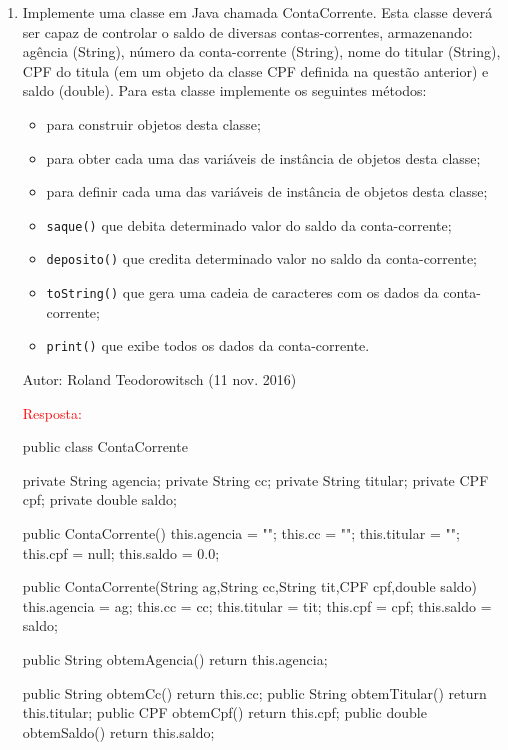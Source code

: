 \documentclass[onecolumn,a4paper,10pt]{report}
\newcommand{\+}{\, + \,}
\newcommand{\<}{\hspace*{-0.4cm}}
\begin{document}
\begin{enumerate}
\item Implemente uma classe em Java chamada ContaCorrente. Esta classe deverá ser capaz de controlar o saldo de diversas contas-correntes, armazenando: agência (String), número da conta-corrente (String), nome do titular (String), CPF do titula (em um objeto da classe CPF definida na questão anterior) e saldo (double). Para esta classe implemente os seguintes métodos:
\begin{itemize}
\item para construir objetos desta classe;
\item para obter cada uma das variáveis de instância de objetos desta classe;
\item para definir cada uma das variáveis de instância de objetos desta classe;
\item \texttt{saque()} que debita determinado valor do saldo da conta-corrente;
\item \texttt{deposito()} que credita determinado valor no saldo da conta-corrente;
\item \texttt{toString()} que gera uma cadeia de caracteres com os dados da conta-corrente;
\item \texttt{print()} que exibe todos os dados da conta-corrente.
\end{itemize}
{\tiny Autor: Roland Teodorowitsch (11 nov. 2016)}\\
\newpage
{\tiny \textcolor{red}{Resposta:}\\
\begin{javacode}
public class ContaCorrente {
    private String agencia;
    private String cc;
    private String titular;
    private CPF cpf;
    private double saldo;
    
    public ContaCorrente() {
        this.agencia = "";
        this.cc = "";
        this.titular = "";
        this.cpf = null;
        this.saldo = 0.0;
    }

    public ContaCorrente(String ag,String cc,String tit,CPF cpf,double saldo) {
        this.agencia = ag;
        this.cc = cc;
        this.titular = tit;
        this.cpf = cpf;
        this.saldo = saldo;
    }

    public String obtemAgencia() {
        return this.agencia;
    }
    
    public String obtemCc() {
        return this.cc;
    }
    public String obtemTitular() {
        return this.titular;
    }
    public CPF obtemCpf() {
        return this.cpf;
    }
    public double obtemSaldo() {
        return this.saldo;
    }

}
\end{javacode}}
\end{enumerate}
\end{document}
